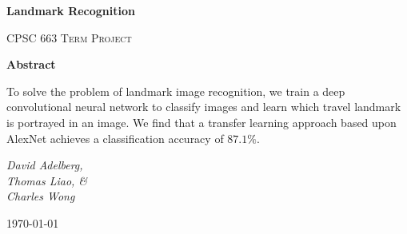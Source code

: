 \begin{titlepage}
	\centering
	{\vspace*{1cm}
	\huge\bfseries Landmark Recognition\par}
	\vspace{1cm}
	\par
	\vspace{1cm}
	{\scshape\Large CPSC 663 Term Project\par}
	\vspace{1cm}
	\large \textbf{Abstract}\par
	To solve the problem of landmark image recognition, we train a deep convolutional neural network to classify images and learn which travel landmark is portrayed in an image. We find that a transfer learning approach based upon AlexNet achieves a classification accuracy of $87.1\%$.
	
	\vspace{1cm}
	{\Large\itshape David Adelberg,\\Thomas Liao, \&\\Charles Wong\par}
	\vfill
	{\large \today\par}
\end{titlepage}